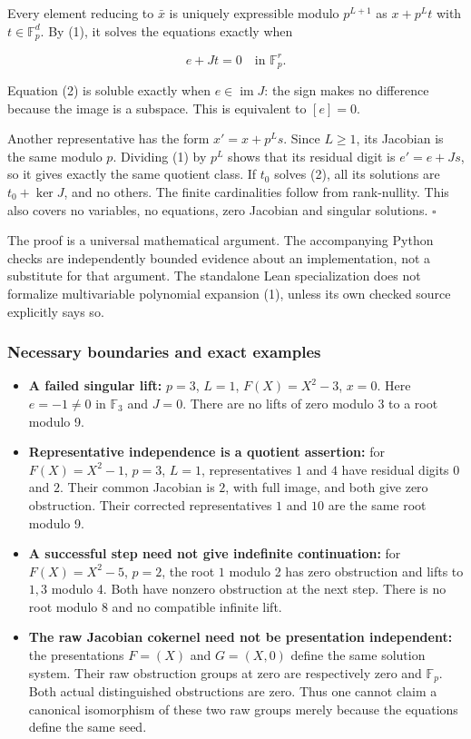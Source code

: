 Every element reducing to \(\bar x\) is uniquely expressible modulo
\(p^{L+1}\) as \(x+p^Lt\) with \(t\in\mathbb F_p^d\). By (1), it solves
the equations exactly when

\[e+Jt=0\quad\text{in }\mathbb F_p^r.\tag{2}\]

Equation (2) is soluble exactly when \(e\in\operatorname{im}J\): the
sign makes no difference because the image is a subspace. This is
equivalent to \([e]=0\).

Another representative has the form \(x'=x+p^Ls\). Since \(L\ge1\), its
Jacobian is the same modulo \(p\). Dividing (1) by \(p^L\) shows that
its residual digit is \(e'=e+Js\), so it gives exactly the same quotient
class. If \(t_0\) solves (2), all its solutions are \(t_0+\ker J\), and
no others. The finite cardinalities follow from rank-nullity. This also
covers no variables, no equations, zero Jacobian and singular solutions.
\(\square\)

The proof is a universal mathematical argument. The accompanying Python
checks are independently bounded evidence about an implementation, not a
substitute for that argument. The standalone Lean specialization does
not formalize multivariable polynomial expansion (1), unless its own
checked source explicitly says so.

\hypertarget{native:necessary-boundaries-and-exact-examples}{%
\subsubsection{Necessary boundaries and exact
examples}\label{native:necessary-boundaries-and-exact-examples}}

\begin{itemize}
\tightlist
\item
  \textbf{A failed singular lift:} \(p=3\), \(L=1\), \(F(X)=X^2-3\),
  \(x=0\). Here \(e=-1\ne0\) in \(\mathbb F_3\) and \(J=0\). There are
  no lifts of zero modulo 3 to a root modulo 9.
\item
  \textbf{Representative independence is a quotient assertion:} for
  \(F(X)=X^2-1\), \(p=3\), \(L=1\), representatives \(1\) and \(4\) have
  residual digits \(0\) and \(2\). Their common Jacobian is \(2\), with
  full image, and both give zero obstruction. Their corrected
  representatives \(1\) and \(10\) are the same root modulo 9.
\item
  \textbf{A successful step need not give indefinite continuation:} for
  \(F(X)=X^2-5\), \(p=2\), the root \(1\) modulo 2 has zero obstruction
  and lifts to \(1,3\) modulo 4. Both have nonzero obstruction at the
  next step. There is no root modulo 8 and no compatible infinite lift.
\item
  \textbf{The raw Jacobian cokernel need not be presentation
  independent:} the presentations \(F=(X)\) and \(G=(X,0)\) define the
  same solution system. Their raw obstruction groups at zero are
  respectively zero and \(\mathbb F_p\). Both actual distinguished
  obstructions are zero. Thus one cannot claim a canonical isomorphism
  of these two raw groups merely because the equations define the same
  seed.
\end{itemize}

